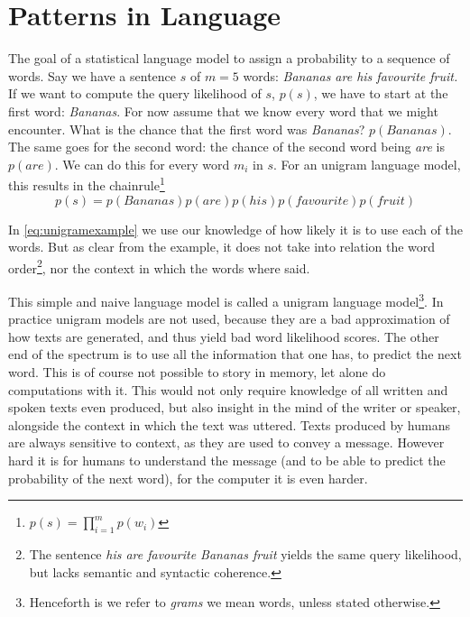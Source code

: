 
\section{Patterns in Language}
The goal of a statistical language model to assign a probability to a sequence of words. Say we have a sentence $s$ of $m=5$ words: \emph{Bananas are his favourite fruit.} If we want to compute the query likelihood of $s$, $p(s)$, we have to start 
at the first word: \emph{Bananas}. For now assume that we know every word that we might encounter. What is the chance that the first word was \emph{Bananas}? $p(\mathit{Bananas})$. The same goes for the second word: the chance of the second word being \emph{are} is $p(\mathit{are})$. We can do this for every word $m_i$ in $s$. For an unigram language model, this results in the chainrule\footnote{$p(s)=\prod_{i=1}^m p(w_i)$}
\begin{equation}
p(s) = p(\mathit{Bananas})p(\mathit{are})p(\mathit{his})p(\mathit{favourite})p(\mathit{fruit})\label{eq:unigramexample}
\end{equation}

In \cref{eq:unigramexample} we use our knowledge of how likely it is to use each of the words. But as clear from the example, it does not take into relation the word order\footnote{The sentence \emph{his are favourite Bananas fruit} yields the same query likelihood, but lacks semantic and syntactic coherence.}, nor the context in which the words where said.

This simple and naive language model is called a unigram language model\footnote{Henceforth is we refer to \emph{grams} we mean words, unless stated otherwise.}. In practice unigram models are not used, because they are a bad approximation of how texts are generated, and thus yield bad word likelihood scores.
%
The other end of the spectrum is to use all the information that one has, to predict the next word. This is of course not possible to story in memory, let alone do computations with it.
%
This would not only require knowledge of all written and spoken texts even produced, but also insight in the mind of the writer or speaker, alongside the context in which the text was uttered. Texts produced by humans are always sensitive to context, as they are used to convey a message. However hard it is for humans to understand the message (and to be able to predict the probability of the next word), for the computer it is even harder.

